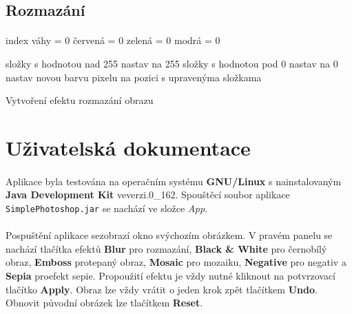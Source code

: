 \documentclass[12pt]{scrartcl}
\begin{document}
\subsection{Rozmazání}
\paragraph{}
\begin{algorithm}[H]
	 {
		 {

			index váhy = 0\;
			červená = 0\;
			zelená = 0\;
			modrá = 0\;
			
			 {
				 {
				}
			}
			složky s hodnotou nad 255 nastav na 255\;
			složky s hodnotou pod 0 nastav na 0\;	
			nastav novou barvu pixelu na pozici s upravenýma složkama\;
		}
	}
 \caption{Vytvoření efektu rozmazání obrazu}
\end{algorithm}

\newpage
\section{Uživatelská dokumentace}
\paragraph{}
Aplikace byla testována na operačním systému \textbf{GNU/Linux} s nainstalovaným \textbf{Java Development Kit} ve\nobreakspace verzi.0\_162. Spouštěcí soubor aplikace \texttt{SimplePhotoshop.jar} se nachází ve složce \emph{App}.

\paragraph{}
Po\nobreakspace spuštění aplikace se\nobreakspace zobrazí okno s\nobreakspace výchozím obrázkem. V pravém panelu se nachází tlačítka efektů \textbf{Blur} pro rozmazání, \textbf{Black \& White} pro černobílý obraz, \textbf{Emboss} pro\nobreakspace tepaný obraz, \textbf{Mosaic} pro mozaiku, \textbf{Negative} pro negativ a \textbf{Sepia} pro\nobreakspace efekt sepie. Pro\nobreakspace použití efektu je vždy nutné kliknout na potvrzovací tlačítko \textbf{Apply}. Obraz lze vždy vrátit o jeden krok zpět tlačítkem \textbf{Undo}. Obnovit původní obrázek lze tlačítkem \textbf{Reset}.
\end{document}
